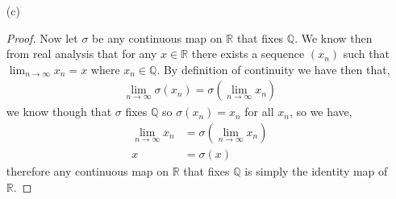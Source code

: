 \documentclass[11pt]{article}
\newcommand{\qq}{\mathbb Q}   %
\newcommand{\rr}{\mathbb R}   %
\newcommand{\abs}[1]{\left\lvert#1\right\rvert} %
\renewcommand{\epsilon}{\varepsilon}
\begin{document}
\begin{itemize}
\begin{proof}
    For $\sigma$ to be continuous we must have that for any $\epsilon > 0$ there exists $\delta > 0$ such that,
    \[\abs{ a- b} < \delta \implies \abs{\sigma(a) - \sigma(b)} < \epsilon.\]
    We see though that we can let $\delta = \epsilon$ and the implication we just proved proves the continuity of $\sigma$.
  \end{proof}
  \vspace*{15pt}
  \item[(c)]  
  \begin{proof}
    Now let $\sigma$ be any continuous map on $\rr$ that fixes $\qq$. We know then from real analysis that for any $x \in \rr$ there exists a sequence $(x_n)$ such that $\displaystyle \lim_{n \to \infty}x_n = x$ where $x_n \in \qq$. By definition of continuity we have then that,
    \begin{align*}
      \lim_{n \to \infty}\sigma(x_n) = \sigma(\lim_{n \to \infty}x_n)
    \end{align*} 
    we know though that $\sigma$ fixes $\qq$ so $\sigma(x_n) = x_n$ for all $x_n$, so we have,
    \begin{align*}
      \lim_{n \to \infty}x_n  &= \sigma(\lim_{n \to \infty} x_n) \\ 
      x &= \sigma(x)
    \end{align*}
    therefore any continuous map on $\rr$ that fixes $\qq$ is simply the identity map of $\rr$.
  \end{proof}
\end{itemize}
\end{document}
